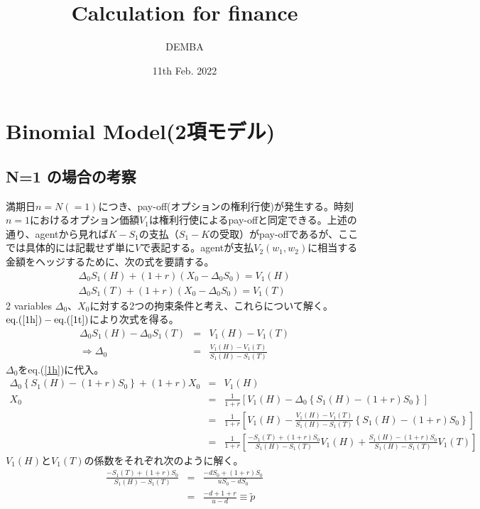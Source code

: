 \documentclass[10pt]{article}
\title{Calculation for finance}
\author{DEMBA}
\date{11th Feb. 2022}
\theoremstyle{plain}
\begin{document}
\pagestyle{fancy}
 \rhead{}
 \lhead{}
 \renewcommand{\headrulewidth}{0pt}
 \rfoot{\thepage}
 \renewcommand{\footrulewidth}{0.4pt}
\maketitle

\section{Binomial Model(2項モデル)}
\subsection{N=1 の場合の考察}
満期日$n=N(=1)$につき、pay-off(オプションの権利行使)が発生する。時刻$n=1$におけるオプション価額$V_1$は権利行使によるpay-offと同定できる。上述の通り、agentから見れば$K-S_1$の支払（$S_1-K$の受取）がpay-offであるが、ここでは具体的には記載せず単に$V$で表記する。agentが支払$V_2(w_1,w_2)$に相当する金額をヘッジするために、次の式を要請する。
\begin{eqnarray}
\Delta_0 S_1(H) + (1+r)\left(X_0 -\Delta_0 S_0 \right) = V_1(H) \label{1h}\\
\Delta_0 S_1(T) + (1+r)\left(X_0 -\Delta_0 S_0 \right) = V_1(T) \label{1t}
\end{eqnarray}
2 variables $\Delta_0$、$X_0$に対する2つの拘束条件と考え、これらについて解く。\\
$\textrm{eq.}(\ref{1h}) - \textrm{eq.}(\ref{1t})$により次式を得る。
\begin{eqnarray}
\Delta_0 S_1(H)-\Delta_0 S_1(T) &=& V_1(H)-V_1(T) \\
\Rightarrow \Delta_0 &=& \frac{V_1(H)-V_1(T)}{S_1(H)-S_1(T)}
\end{eqnarray}
$\Delta_0$をeq.(\ref{1h})に代入。
\begin{eqnarray}
\Delta_0 \left\{S_1(H)-(1+r)S_0\right\} + (1+r)X_0 &=& V_1(H) \\
X_0 &=& \frac{1}{1+r}\left[V_1(H) - \Delta_0 \left\{S_1(H)-(1+r)S_0\right\} \right]\\
&=&\frac{1}{1+r}\left[V_1(H) - \frac{V_1(H)-V_1(T)}{S_1(H)-S_1(T)} \left\{S_1(H)-(1+r)S_0\right\} \right]\\
&=&\frac{1}{1+r}\left[\frac{-S_1(T)+(1+r)S_0}{S_1(H)-S_1(T)}V_1(H)+ \frac{S_1(H)-(1+r)S_0}{S_1(H)-S_1(T)}V_1(T)\right]
\end{eqnarray}
$V_1(H)$と$V_1(T)$の係数をそれぞれ次のように解く。
\begin{eqnarray}
\frac{-S_1(T)+(1+r)S_0}{S_1(H)-S_1(T)}&=&\frac{-dS_0+(1+r)S_0}{uS_0-dS_0}\\
&=&\frac{-d+1+r}{u-d} \equiv \tilde{p}
\end{eqnarray}
\end{document}
